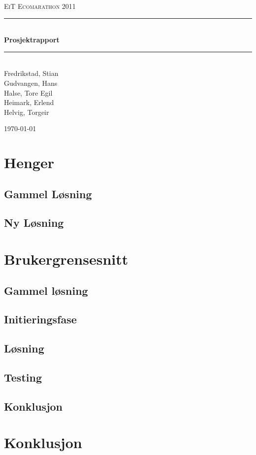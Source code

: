 \documentclass[a4paper,11pt]{report}
\newcommand{\HRule}{\rule{\linewidth}{0.5mm}}
\begin{document}
\begin{titlepage}

\begin{center}
\textsc{\LARGE EiT Ecomarathon 2011}\\[1.5cm]

\HRule \\[0.4cm]
{ \huge \bfseries Prosjektrapport}\\[0.4cm]
\HRule \\[1.5cm] 

Fredrikstad, Stian\\
Gudvangen, Hans\\
Halse, Tore Egil\\
Heimark, Erlend\\
Helvig, Torgeir\\

\vfill
 
{\large \today}

\end{center}
\end{titlepage}
\cleardoublepage
{}
\tableofcontents
\listoffigures
\listoftables
\clearpage

\chapter{Henger}
\section{Gammel Løsning}

\section{Ny Løsning}






\chapter{Brukergrensesnitt}
\section{Gammel løsning}

\newpage
\section{Initieringsfase}


\newpage
\section{Løsning}

\section{Testing}

\section{Konklusjon}

\chapter{Konklusjon}




\appendix



\clearpage 
 
 
\end{document}
